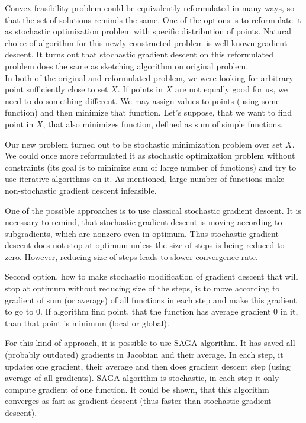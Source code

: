 \documentclass[11pt]{book}
\begin{document}
Convex feasibility problem could be equivalently reformulated in many ways, so that the set of solutions reminds the same. One of the options is to reformulate it as stochastic optimization problem with specific distribution of points. Natural choice of algorithm for this newly constructed problem is well-known gradient descent. It turns out that stochastic gradient descent on this reformulated problem does the same as sketching algorithm on original problem.\\

In both of the original and reformulated problem, we were looking for arbitrary point sufficiently close to set $X$. If points in $X$ are not equally good for us, we need to do something different. We may assign values to points (using some function) and then minimize that function. Let's suppose, that we want to find point in $X$, that also minimizes function, defined as sum of simple functions.

Our new problem turned out to be stochastic minimization problem over set $X$. We could once more reformulated it as stochastic optimization problem without constraints (its goal is to minimize sum of large number of functions) and try to use iterative algorithms on it. As mentioned, large number of functions make non-stochastic gradient descent infeasible.

One of the possible approaches is to use classical stochastic gradient descent. It is necessary to remind, that stochastic gradient descent is moving according to subgradients, which are nonzero even in optimum. Thus stochastic gradient descent does not stop at optimum unless the size of steps is being reduced to zero. However, reducing size of steps leads to slower convergence rate.

Second option, how to make stochastic modification of gradient descent that will stop at optimum without reducing size of the steps, is to move according to gradient of sum (or average) of all functions in each step and make this gradient to go to $0$. If algorithm find point, that the function has average gradient $0$  in it, than that point is minimum (local or global).

For this kind of approach, it is possible to use SAGA algorithm. It has saved all (probably outdated) gradients in Jacobian and their average. In each step, it updates one gradient, their average and then does gradient descent step (using average of all gradients). SAGA algorithm is stochastic, in each step it only compute gradient of one function. It could be shown, that this algorithm converges as fast as gradient descent (thus faster than stochastic gradient descent).\\
\end{document}
